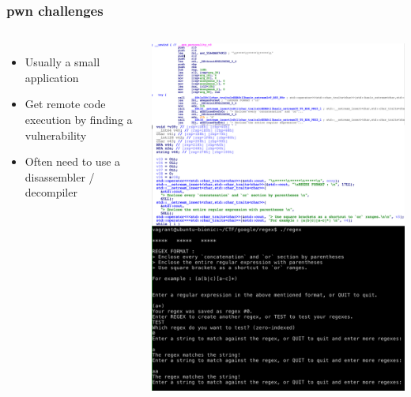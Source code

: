 \documentclass[aspectratio=169]{beamer}
\begin{document}
\begin{frame}
    \frametitle{pwn challenges}
    \begin{columns}
            \centering
            \begin{itemize}
                \item Usually a small application
                \item Get remote code execution by finding a vulnerability
                \item Often need to use a disassembler / decompiler
            \end{itemize}
            \centering
            \includegraphics[width=\textwidth]{pwn_example.jpg}
    \end{columns}
\end{frame}
\end{document}
